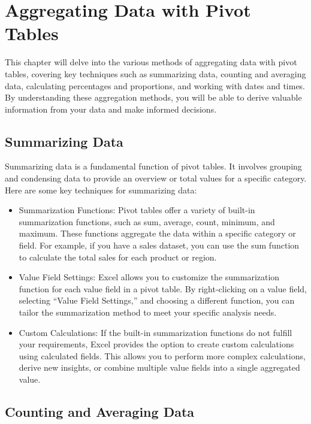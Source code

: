 \documentclass[
]{book}
\begin{document}
\hypertarget{aggregating-data-with-pivot-tables}{%
\chapter{Aggregating Data with Pivot Tables}\label{aggregating-data-with-pivot-tables}}

This chapter will delve into the various methods of aggregating data with pivot tables, covering key techniques such as summarizing data, counting and averaging data, calculating percentages and proportions, and working with dates and times. By understanding these aggregation methods, you will be able to derive valuable information from your data and make informed decisions.

\hypertarget{summarizing-data}{%
\section{Summarizing Data}\label{summarizing-data}}

Summarizing data is a fundamental function of pivot tables. It involves grouping and condensing data to provide an overview or total values for a specific category. Here are some key techniques for summarizing data:

\begin{itemize}
\item
  Summarization Functions: Pivot tables offer a variety of built-in summarization functions, such as sum, average, count, minimum, and maximum. These functions aggregate the data within a specific category or field. For example, if you have a sales dataset, you can use the sum function to calculate the total sales for each product or region.
\item
  Value Field Settings: Excel allows you to customize the summarization function for each value field in a pivot table. By right-clicking on a value field, selecting ``Value Field Settings,'' and choosing a different function, you can tailor the summarization method to meet your specific analysis needs.
\item
  Custom Calculations: If the built-in summarization functions do not fulfill your requirements, Excel provides the option to create custom calculations using calculated fields. This allows you to perform more complex calculations, derive new insights, or combine multiple value fields into a single aggregated value.
\end{itemize}

\hypertarget{counting-and-averaging-data}{%
\section{Counting and Averaging Data}\label{counting-and-averaging-data}}
\end{document}
